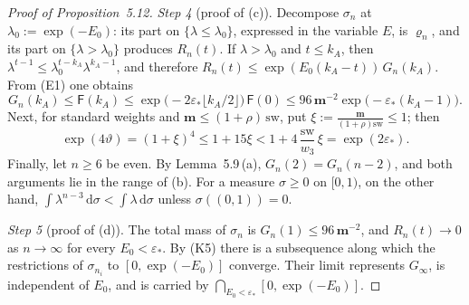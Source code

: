 \documentclass[11pt,letterpaper,reqno]{amsart}
\theoremstyle{definition}
\begin{document}
\begin{proof}[Proof of Proposition~5.12]
\emph{Step 4} (proof of (c)).
Decompose $\sigma_n$ at $\lambda_0:=\exp(-E_0)$: its part on $\{\lambda\le\lambda_0\}$, expressed in the variable $E$, is $\varrho_n$, and its part on $\{\lambda>\lambda_0\}$ produces $R_n(t)$.
If $\lambda>\lambda_0$ and $t\le k_A$, then $\lambda^{t-1}\le\lambda_0^{t-k_A}\lambda^{k_A-1}$, and therefore $R_n(t)\le\exp(E_0(k_A-t))\,G_n(k_A)$.
From (E1) one obtains
\begin{equation*}
G_n(k_A)\le\mathsf F(k_A)\le\exp\bigl(-2\varepsilon_*\lfloor k_A/2\rfloor\bigr)\,\mathsf F(0)\le96\,\mathbf m^{-2}\exp\bigl(-\varepsilon_*(k_A-1)\bigr).
\end{equation*}
Next, for standard weights and $\mathbf m\le(1+\rho)\,\mathrm{sw}$, put $\xi:=\frac{\mathbf m}{(1+\rho)\mathrm{sw}}\le1$; then
\begin{equation*}
\exp(4\vartheta)=(1+\xi)^4\le1+15\xi<1+4\,\frac{\mathrm{sw}}{w_3}\,\xi=\exp(2\varepsilon_*).
\end{equation*}
Finally, let $n\ge6$ be even.
By Lemma~5.9\,(a), $G_n(2)=G_n(n-2)$, and both arguments lie in the range of (b).
For a measure $\sigma\ge0$ on $[0,1)$, on the other hand, $\int\lambda^{n-3}\,\mathrm d\sigma<\int\lambda\,\mathrm d\sigma$ unless $\sigma((0,1))=0$.

\emph{Step 5} (proof of (d)).
The total mass of $\sigma_n$ is $G_n(1)\le96\,\mathbf m^{-2}$, and $R_n(t)\to0$ as $n\to\infty$ for every $E_0<\varepsilon_*$.
By (K5) there is a subsequence along which the restrictions of $\sigma_{n_i}$ to $[0,\exp(-E_0)]$ converge.
Their limit represents $G_\infty$, is independent of $E_0$, and is carried by $\bigcap_{E_0<\varepsilon_*}[0,\exp(-E_0)]$.
\end{proof}
\end{document}
